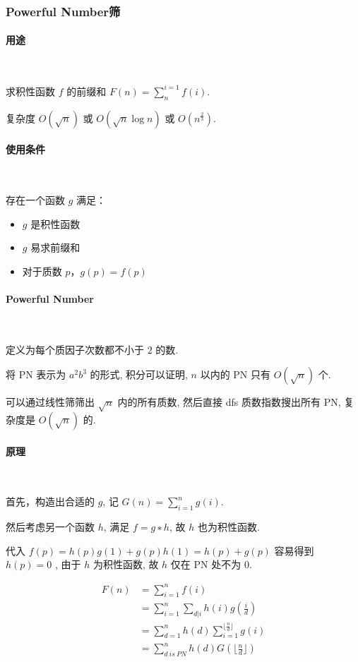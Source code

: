 \documentclass{ctexart}
\begin{document}
\subsubsection{Powerful Number筛}
\paragraph{用途}\ 

求积性函数 $f$ 的前缀和 $F(n)=\sum_n^{i=1} f(i)$.

复杂度 $O(\sqrt{n})$ 或 $O(\sqrt{n}\log n)$ 或 $O(n^{\frac{2}{3}})$.

\paragraph{使用条件}\ 

存在一个函数 $g$ 满足：
\begin{itemize}
    \item $g$ 是积性函数
    \item $g$ 易求前缀和
    \item 对于质数 $p$，$g(p)=f(p)$
\end{itemize}

\paragraph{Powerful Number}\ 

定义为每个质因子次数都不小于 $2$ 的数.

将 PN 表示为 $a^2b^3$ 的形式, 积分可以证明, $n$ 以内的 PN 只有 $O(\sqrt{n})$ 个.

可以通过线性筛筛出 $\sqrt{n}$ 内的所有质数, 然后直接 dfs 质数指数搜出所有 PN, 复杂度是 $O(\sqrt{n})$ 的.

\paragraph{原理}\ 

首先，构造出合适的 $g$, 记 $G(n)=\sum^n_{i=1} g(i)$.

然后考虑另一个函数 $h$, 满足 $f=g∗h$, 故 $h$ 也为积性函数.

代入 $f(p)=h(p)g(1)+g(p)h(1)=h(p)+g(p)$ 容易得到 $h(p)=0$ , 由于 $h$ 为积性函数, 故 $h$ 仅在 PN 处不为 $0$.

\begin{align*}
    F(n) & = \sum_{i=1}^{n} f(i)\\
         & = \sum_{i=1}^{n} \sum_{d|i}h(i)g(\frac{i}{d})\\
         & = \sum_{d=1}^{n} h(d) \sum_{i=1}^{\lfloor \frac{n}{d} \rfloor} g(i)\\
         & = \sum_{d~is~PN}^{n} h(d) G(\lfloor \frac{n}{d} \rfloor)
\end{align*}
\end{document}
